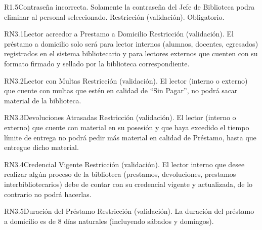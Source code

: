 \begin{BussinesRule}{R1.5}{Contraseña incorrecta.} 
	\BRitem[Descripción:] Solamente la contraseña del Jefe de Biblioteca podra eliminar al personal seleccionado.
	\BRitem[Tipo:] Restricción (validación).
	\BRitem[Nivel:] Obligatorio.
\end{BussinesRule}


\begin{BussinesRule}{RN3.1}{Lector acreedor a Prestamo a Domicilio} 
	\BRitem[Tipo:] Restricción (validación).
	\BRitem[Descripción:]El préstamo a domicilio solo será para lector internos (alumnos, docentes, egresados) registrados en el sistema bibliotecario y para lectores externos que cuenten con su formato firmado y sellado por la biblioteca correspondiente.
\end{BussinesRule}

\begin{BussinesRule}{RN3.2}{Lector con Multas} 
	\BRitem[Tipo:] Restricción (validación).
	\BRitem[Descripción:]El lector (interno o externo) que cuente con multas que estén en calidad de “Sin Pagar”, no podrá sacar material de la biblioteca.
\end{BussinesRule}

\begin{BussinesRule}{RN3.3}{Devoluciones Atrasadas} 
	\BRitem[Tipo:] Restricción (validación).
	\BRitem[Descripción:]El lector (interno o externo) que cuente con material en su posesión y que haya excedido el tiempo límite de entrega no podrá pedir más material en calidad de Préstamo, hasta que entregue dicho material.
\end{BussinesRule}

\begin{BussinesRule}{RN3.4}{Credencial Vigente} 
	\BRitem[Tipo:] Restricción (validación).
	\BRitem[Descripción:]El lector interno que desee realizar algún proceso de la biblioteca (prestamos, devoluciones, prestamos interbibliotecarios) debe de contar con su credencial vigente y actualizada, de lo contrario no podrá hacerlas.
\end{BussinesRule}

\begin{BussinesRule}{RN3.5}{Duración del Préstamo} 
	\BRitem[Tipo:] Restricción (validación).
	\BRitem[Descripción:]La duración del préstamo a domicilio es de 8 días naturales (incluyendo sábados y domingos).
\end{BussinesRule}

